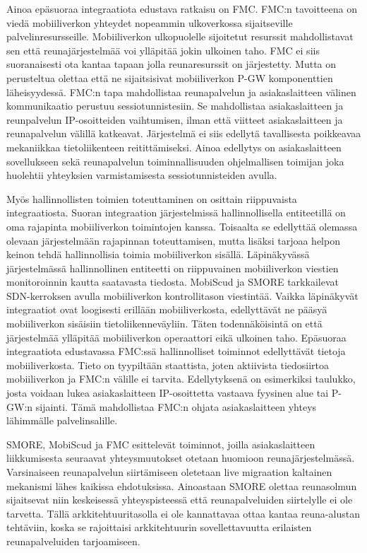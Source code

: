Ainoa epäsuoraa integraatiota edustava ratkaisu on FMC.
FMC:n tavoitteena on viedä mobiiliverkon yhteydet nopeammin ulkoverkossa sijaitseville palvelinresursseille. Mobiiliverkon ulkopuolelle sijoitetut resurssit mahdollistavat sen että reunajärjestelmää voi ylläpitää jokin ulkoinen taho.
FMC ei siis suoranaisesti ota kantaa tapaan jolla reunaresurssit on järjestetty. Mutta on perusteltua olettaa että ne sijaitsisivat mobiiliverkon P-GW komponenttien läheisyydessä.
FMC:n tapa mahdollistaa reunapalvelun ja asiakaslaitteen välinen kommunikaatio perustuu sessiotunnistesiin. Se mahdollistaa asiakaslaitteen ja reunpalvelun IP-osoitteiden vaihtumisen, ilman että viitteet asiakaslaitteen ja reunapalvelun välillä katkeavat. Järjestelmä ei siis edellytä tavallisesta poikkeavaa mekaniikkaa tietoliikenteen reitittämiseksi. Ainoa edellytys on asiakaslaitteen sovellukseen sekä reunapalvelun toiminnallisuuden ohjelmallisen toimijan joka huolehtii yhteyksien varmistamisesta sessiotunnisteiden avulla.

Myös hallinnollisten toimien toteuttaminen on osittain riippuvaista integraatiosta. Suoran integraation järjestelmissä hallinnollisella entiteetillä on oma rajapinta mobiiliverkon toimintojen kanssa. 
Toisaalta se edellyttää olemassa olevaan järjestelmään rajapinnan toteuttamisen, mutta lisäksi tarjoaa helpon keinon tehdä hallinnollisia toimia mobiiliverkon sisällä. 
Läpinäkyvässä järjestelmässä hallinnollinen entiteetti on riippuvainen mobiiliverkon viestien monitoroinnin kautta saatavasta tiedosta. 
MobiScud ja SMORE tarkkailevat SDN-kerroksen avulla mobiiliverkon kontrollitason viestintää. 
Vaikka läpinäkyvät integraatiot ovat loogisesti erillään mobiiliverkosta, edellyttävät ne pääsyä mobiiliverkon sisäisiin tietoliikenneväyliin.
Täten todennäköisintä on että järjestelmää ylläpitää mobiiliverkon operaattori eikä ulkoinen taho. 
Epäsuoraa integraatiota edustavassa FMC:ssä hallinnolliset toiminnot edellyttävät tietoja mobiiliverkosta. Tieto on tyypiltään staattista, joten aktiivista tiedosiirtoa mobiiliverkon ja FMC:n välille ei tarvita.
Edellytyksenä on esimerkiksi taulukko, josta voidaan lukea asiakaslaitteen IP-osoittetta vastaava fyysinen alue tai P-GW:n sijainti. Tämä mahdollistaa FMC:n ohjata asiakaslaitteen yhteys lähimmälle palvelinsalille. 


SMORE, MobiScud ja FMC esittelevät toiminnot, joilla asiakaslaitteen liikkumisesta seuraavat yhteysmuutokset otetaan huomioon reunajärjestelmässä.
Varsinaiseen reunapalvelun siirtämiseen oletetaan live migraation kaltainen mekanismi lähes kaikissa ehdotuksissa. Ainoastaan SMORE olettaa reunasolmun sijaitsevat niin keskeisessä yhteyspisteessä että reunapalveluiden siirtelylle ei ole tarvetta.
Tällä arkkitehtuuritasolla ei ole kannattavaa ottaa kantaa reuna-alustan tehtäviin, koska se rajoittaisi arkkitehtuurin sovellettavuutta erilaisten reunapalveluiden tarjoamiseen.

